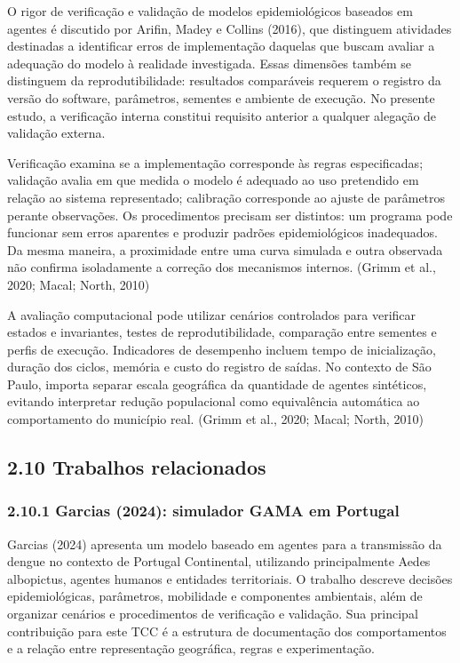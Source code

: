 O rigor de verificação e validação de modelos epidemiológicos baseados
em agentes é discutido por Arifin, Madey e Collins (2016), que
distinguem atividades destinadas a identificar erros de implementação
daquelas que buscam avaliar a adequação do modelo à realidade
investigada. Essas dimensões também se distinguem da reprodutibilidade:
resultados comparáveis requerem o registro da versão do software,
parâmetros, sementes e ambiente de execução. No presente estudo, a
verificação interna constitui requisito anterior a qualquer alegação de
validação externa.

Verificação examina se a implementação corresponde às regras
especificadas; validação avalia em que medida o modelo é adequado ao uso
pretendido em relação ao sistema representado; calibração corresponde ao
ajuste de parâmetros perante observações. Os procedimentos precisam ser
distintos: um programa pode funcionar sem erros aparentes e produzir
padrões epidemiológicos inadequados. Da mesma maneira, a proximidade
entre uma curva simulada e outra observada não confirma isoladamente a
correção dos mecanismos internos. (Grimm et al., 2020; Macal; North,
2010)

A avaliação computacional pode utilizar cenários controlados para
verificar estados e invariantes, testes de reprodutibilidade, comparação
entre sementes e perfis de execução. Indicadores de desempenho incluem
tempo de inicialização, duração dos ciclos, memória e custo do registro
de saídas. No contexto de São Paulo, importa separar escala geográfica
da quantidade de agentes sintéticos, evitando interpretar redução
populacional como equivalência automática ao comportamento do município
real. (Grimm et al., 2020; Macal; North, 2010)

\subsection{2.10 Trabalhos relacionados}\label{trabalhos-relacionados}

\subsubsection{2.10.1 Garcias (2024): simulador GAMA em
Portugal}\label{garcias-2024-simulador-gama-em-portugal}

Garcias (2024) apresenta um modelo baseado em agentes para a transmissão
da dengue no contexto de Portugal Continental, utilizando principalmente
Aedes albopictus, agentes humanos e entidades territoriais. O trabalho
descreve decisões epidemiológicas, parâmetros, mobilidade e componentes
ambientais, além de organizar cenários e procedimentos de verificação e
validação. Sua principal contribuição para este TCC é a estrutura de
documentação dos comportamentos e a relação entre representação
geográfica, regras e experimentação.

